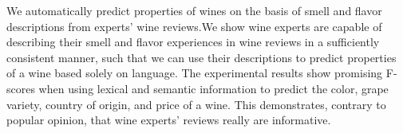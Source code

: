 We automatically predict properties of wines on the basis of smell and flavor descriptions from experts' wine reviews.We show wine experts are capable of describing their  smell and flavor experiences in wine reviews in a sufficiently consistent manner, such that we can use their descriptions to predict properties of a wine based solely on language. The experimental results show promising F-scores when using lexical and semantic information to predict the color, grape variety, country of origin, and price of a wine. This demonstrates, contrary to popular opinion, that wine experts' reviews really are informative.

